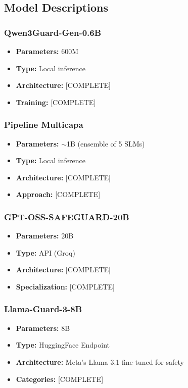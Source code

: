 \documentclass[11pt,a4paper]{article}
\begin{document}
\subsection{Model Descriptions}

\subsubsection{Qwen3Guard-Gen-0.6B}
\begin{itemize}
    \item \textbf{Parameters:} 600M
    \item \textbf{Type:} Local inference
    \item \textbf{Architecture:} [COMPLETE]
    \item \textbf{Training:} [COMPLETE]
\end{itemize}

\subsubsection{Pipeline Multicapa}
\begin{itemize}
    \item \textbf{Parameters:} $\sim$1B (ensemble of 5 SLMs)
    \item \textbf{Type:} Local inference
    \item \textbf{Architecture:} [COMPLETE]
    \item \textbf{Approach:} [COMPLETE]
\end{itemize}

\subsubsection{GPT-OSS-SAFEGUARD-20B}
\begin{itemize}
    \item \textbf{Parameters:} 20B
    \item \textbf{Type:} API (Groq)
    \item \textbf{Architecture:} [COMPLETE]
    \item \textbf{Specialization:} [COMPLETE]
\end{itemize}

\subsubsection{Llama-Guard-3-8B}
\begin{itemize}
    \item \textbf{Parameters:} 8B
    \item \textbf{Type:} HuggingFace Endpoint
    \item \textbf{Architecture:} Meta's Llama 3.1 fine-tuned for safety
    \item \textbf{Categories:} [COMPLETE]
\end{itemize}
\end{document}
